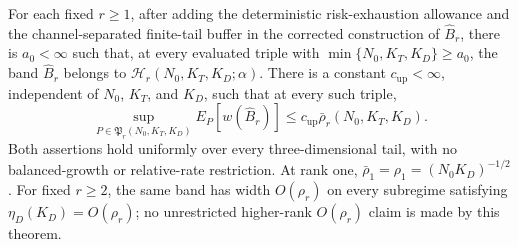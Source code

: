 For each fixed \(r\ge1\), after adding the deterministic risk-exhaustion allowance and the channel-separated finite-tail buffer in the corrected construction of \(\widehat B_r\), there is \(a_0<\infty\) such that, at every evaluated triple with \(\min\{N_0,K_T,K_D\}\ge a_0\), the band \(\widehat B_r\) belongs to \(\mathcal H_r(N_0,K_T,K_D;\alpha)\). There is a constant \(c_{\mathrm{up}}<\infty\), independent of \(N_0\), \(K_T\), and \(K_D\), such that at every such triple,
\[
 \sup_{P\in\mathfrak P_r(N_0,K_T,K_D)}E_P[w(\widehat B_r)]
 \le c_{\mathrm{up}}\bar\rho_r(N_0,K_T,K_D).
\]
Both assertions hold uniformly over every three-dimensional tail, with no balanced-growth or relative-rate restriction. At rank one, \(\bar\rho_1=\rho_1=(N_0K_D)^{-1/2}\). For fixed \(r\ge2\), the same band has width \(O(\rho_r)\) on every subregime satisfying \(\eta_D(K_D)=O(\rho_r)\); no unrestricted higher-rank \(O(\rho_r)\) claim is made by this theorem.